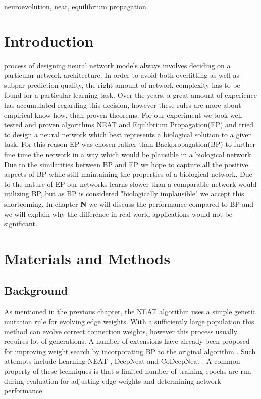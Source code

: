 \documentclass[lettersize,journal]{IEEEtran}
\begin{document}

\begin{IEEEkeywords}
neuroevolution, neat, equilibrium propagation.
\end{IEEEkeywords}

\section{Introduction}
 process of designing neural network models always involves deciding on a particular network architecture. In order to avoid both overfitting as well as subpar prediction quality, the right amount of network complexity has to be found for a particular learning task. Over the years, a great amount of experience has accumulated regarding this decision, however these rules are more about empirical know-how, than proven theorems. For our experiment we took well tested and proven algorithms NEAT and Equlibrium Propagation(EP)\cite{eqprop} and tried to design a neural network which best represents a biological solution to a given task. For this reason EP was chosen rather than Backpropagation(BP)\cite{backprop} to further fine tune the network in a way which would be plausible in a biological network. Due to the similarities between BP and EP we hope to capture all the positive aspects of BP while still maintaining the properties of a biological network. Due to the nature of EP our networks learns slower than a comparable network would utilizing BP, but as BP is considered "biologically implausible" we accept this shortcoming. In chapter \textbf{N} we will discuss the performance compared to BP and we will explain why the difference in real-world applications would not be significant.

\section{Materials and Methods}
\subsection{Background}
As mentioned in the previous chapter, the NEAT algorithm uses a simple genetic mutation rule for evolving edge weights. With a sufficiently large population this method can evolve correct connection weights, however this process usually requires lot of generations. A number of extensions have already been proposed for improving weight search by incorporating BP to the original algorithm \cite{neatsurvey}. Such attempts include Learning-NEAT \cite{lneat}, DeepNeat and CoDeepNeat \cite{codeepneat}. A common property of these techniques is that s limited number of training epochs are run during evaluation for adjusting edge weights and determining network performance. 
\end{document}
